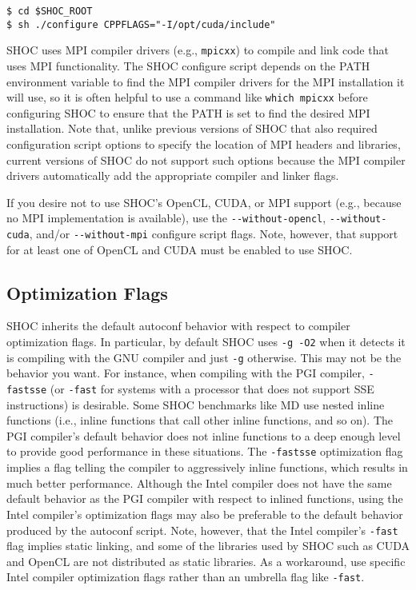 \documentclass[11pt]{article}
\begin{document}
\begin{Verbatim}[frame=single]
$ cd $SHOC_ROOT
$ sh ./configure CPPFLAGS="-I/opt/cuda/include"
\end{Verbatim}

SHOC uses MPI compiler drivers (e.g., \verb+mpicxx+) to compile and link code
that uses MPI functionality.
The SHOC configure script depends on the PATH environment variable to find
the MPI compiler drivers for the MPI installation it will use, so it is often
helpful to use a command like \verb+which mpicxx+ before configuring SHOC
to ensure that the PATH is set to find the desired MPI installation.
Note that, unlike previous versions of SHOC that also required configuration
script options to specify the location of MPI headers and libraries, current
versions of SHOC do not support such options because the MPI compiler drivers
automatically add the appropriate compiler and linker flags.

If you desire not to use SHOC's OpenCL, CUDA, or MPI support (e.g., because
no MPI implementation is available), use the \verb+--without-opencl+,
\verb+--without-cuda+,
and/or \verb+--without-mpi+ configure script flags.
Note, however, that support for at least one of OpenCL and CUDA must be
enabled to use SHOC.

\subsection{Optimization Flags}\label{sec:confoptflags}

SHOC inherits the default autoconf behavior with respect to compiler 
optimization flags.
In particular, by default SHOC uses \verb+-g -O2+ when it detects it is
compiling with the GNU compiler and just \verb+-g+ otherwise.
This may not be the behavior you want.
For instance, when compiling with the PGI compiler, \verb+-fastsse+ 
(or \verb+-fast+ for systems with a processor that does not support SSE
instructions) is desirable.
Some SHOC benchmarks like MD use nested inline functions (i.e., inline
functions that call other inline functions, and so on).
The PGI compiler's default behavior does not inline functions to a deep enough
level to provide good performance in these situations.
The \verb+-fastsse+ optimization flag implies a flag telling the compiler
to aggressively inline functions, which results in much better performance.
Although the Intel compiler does not have the same default behavior as
the PGI compiler with respect to inlined functions, using the Intel
compiler's optimization flags may also be preferable to the default behavior
produced by the autoconf script.
Note, however, that the Intel compiler's \verb+-fast+ flag implies static
linking, and some of the libraries used by SHOC such as CUDA and OpenCL 
are not distributed as static libraries.
As a workaround, use specific Intel compiler optimization flags rather than
an umbrella flag like \verb+-fast+.
\end{document}
